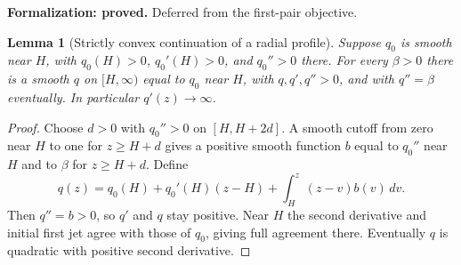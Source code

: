 \documentclass[11pt]{amsart}
\newtheorem{lemma}[theorem]{Lemma}
\theoremstyle{definition}
\theoremstyle{remark}
\numberwithin{equation}{section}
\begin{document}
\par\noindent\textbf{Formalization: proved.} Deferred from the first-pair objective.\par
\begin{lemma}[Strictly convex continuation of a radial profile]
\label{lem:complete-profile}
Suppose $q_0$ is smooth near $H$, with $q_0(H)>0$, $q_0'(H)>0$,
and $q_0''>0$ there. For every $\beta>0$ there is a smooth $q$ on
$[H,\infty)$ equal to $q_0$ near $H$, with $q,q',q''>0$, and with
$q''=\beta$ eventually. In particular $q'(z)\to\infty$.
\end{lemma}
\begin{proof}
Choose $d>0$ with $q_0''>0$ on $[H,H+2d]$. A smooth cutoff from zero
near $H$ to one for $z\ge H+d$ gives a positive smooth function $b$
equal to $q_0''$ near $H$ and to $\beta$ for $z\ge H+d$.
Define
\begin{equation}\label{eq:complete-profile}
 q(z)=q_0(H)+q_0'(H)(z-H)+\int_H^z(z-v)b(v)\,dv.
\end{equation}
Then $q''=b>0$, so $q'$ and $q$ stay positive. Near $H$ the second
derivative and initial first jet agree with those of $q_0$, giving full
agreement there. Eventually $q$ is quadratic with positive second derivative.
\end{proof}
\end{document}
